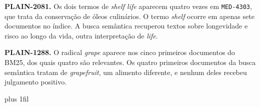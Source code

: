 \documentclass[12pt]{article}
\begin{document}
\begin{minipage}{\linewidth}
\textbf{PLAIN-2081.} Os dois termos de \textit{shelf life} aparecem quatro
vezes em \texttt{MED-4303}, que trata da conservação de óleos culinários.
O termo \textit{shelf} ocorre em apenas sete documentos no índice.
A busca semântica recuperou textos sobre longevidade e risco ao longo da
vida, outra interpretação de \textit{life}.

\textbf{PLAIN-1288.} O radical \textit{grape} aparece nos cinco primeiros
documentos do BM25, dos quais quatro são relevantes. Os quatro primeiros
documentos da busca semântica tratam de \textit{grapefruit}, um alimento
diferente, e nenhum deles recebeu julgamento positivo.
\end{minipage}
\par\nobreak
\vskip 0pt plus 1fil\relax
{}

\medskip
\end{document}
